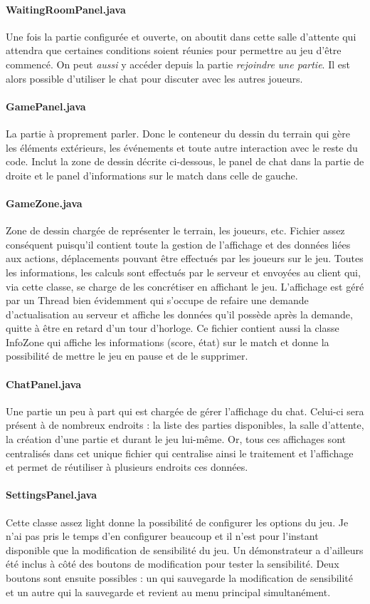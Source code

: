 \documentclass[a4paper,12pt]{report}
\begin{document}
\paragraph{WaitingRoomPanel.java}
Une fois la partie configurée et ouverte, on aboutit dans cette salle d'attente qui attendra que certaines conditions soient réunies pour permettre au jeu d'être commencé. On peut \emph{aussi} y accéder depuis la partie \emph{rejoindre une partie}. Il est alors possible d'utiliser le chat pour discuter avec les autres joueurs.
\paragraph{GamePanel.java}
La partie à proprement parler. Donc le conteneur du dessin du terrain qui gère les éléments extérieurs, les événements et toute autre interaction avec le reste du code. Inclut la zone de dessin décrite ci-dessous, le panel de chat dans la partie de droite et le panel d'informations sur le match dans celle de gauche.
\paragraph{GameZone.java}
Zone de dessin chargée de représenter le terrain, les joueurs, etc. Fichier assez conséquent puisqu'il contient toute la gestion de l'affichage et des données liées aux actions, déplacements pouvant être effectués par les joueurs sur le jeu. Toutes les informations, les calculs sont effectués par le serveur et envoyées au client qui, via cette classe, se charge de les concrétiser en affichant le jeu. L'affichage est géré par un Thread bien évidemment qui s'occupe de refaire une demande d'actualisation au serveur et affiche les données qu'il possède après la demande, quitte à être en retard d'un tour d'horloge. Ce fichier contient aussi la classe InfoZone qui affiche les informations (score, état) sur le match et donne la possibilité de mettre le jeu en pause et de le supprimer.
\paragraph{ChatPanel.java}
Une partie un peu à part qui est chargée de gérer l'affichage du chat. Celui-ci sera présent à de nombreux endroits : la liste des parties disponibles, la salle d'attente, la création d'une partie et durant le jeu lui-même. Or, tous ces affichages sont centralisés dans cet unique fichier qui centralise ainsi le traitement et l'affichage et permet de réutiliser à plusieurs endroits ces données.
\paragraph{SettingsPanel.java}
Cette classe assez light donne la possibilité de configurer les options du jeu. Je n'ai pas pris le temps d'en configurer beaucoup et il n'est pour l'instant disponible que la modification de sensibilité du jeu. Un démonstrateur a d'ailleurs été inclus à côté des boutons de modification pour tester la sensibilité. Deux boutons sont ensuite possibles : un qui sauvegarde la modification de sensibilité et un autre qui la sauvegarde et revient au menu principal simultanément.
\end{document}
